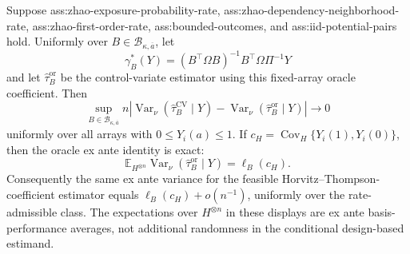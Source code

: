 Suppose ass:zhao-exposure-probability-rate, ass:zhao-dependency-neighborhood-rate, ass:zhao-first-order-rate, ass:bounded-outcomes, and ass:iid-potential-pairs hold.  Uniformly over \(B\in\mathcal B_{\kappa,\overline a}\), let
\[
\gamma_B^*(Y)=(B^{\top}\Omega B)^{-1}B^{\top}\Omega\Pi^{-1}Y
\]
and let \(\widehat\tau_B^{\mathrm{or}}\) be the control-variate estimator using this fixed-array oracle coefficient.  Then
\[
\sup_{B\in\mathcal B_{\kappa,\overline a}}
n\left|
\operatorname{Var}_\nu(\widehat\tau_B^{\mathrm{CV}}\mid Y)
-\operatorname{Var}_\nu(\widehat\tau_B^{\mathrm{or}}\mid Y)
\right|\longrightarrow0
\]
uniformly over all arrays with \(0\le Y_i(a)\le1\).  If \(c_H=\operatorname{Cov}_H\{Y_i(1),Y_i(0)\}\), then the oracle ex ante identity is exact:
\[
\mathbb E_{H^{\otimes n}}
\operatorname{Var}_\nu(\widehat\tau_B^{\mathrm{or}}\mid Y)
=\ell_B(c_H).
\]
Consequently the same ex ante variance for the feasible Horvitz--Thompson-coefficient estimator equals \(\ell_B(c_H)+o(n^{-1})\), uniformly over the rate-admissible class.  The expectations over \(H^{\otimes n}\) in these displays are ex ante basis-performance averages, not additional randomness in the conditional design-based estimand.